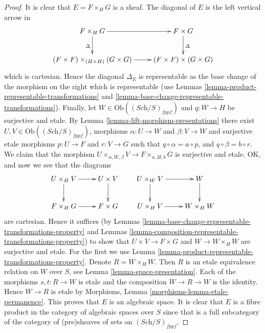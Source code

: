 \begin{proof}
It is clear that $E = F \times_H G$ is a sheaf.
The diagonal of $E$ is the left vertical arrow in
$$
\xymatrix{
F \times_H G \ar[r] \ar[d]_\Delta &
F \times G \ar[d]^\Delta \\
(F \times F) \times_{(H \times H)} (G \times G) \ar[r] &
(F \times F) \times (G \times G)
}
$$
which is cartesian. Hence the diagonal $\Delta_E$ is
representable as the base change of the morphism
on the right which is representable (use Lemmas
\ref{lemma-product-representable-transformations} and
\ref{lemma-base-change-representable-transformations}).
Finally, let $W \in \text{Ob}((\textit{Sch}/S)_{fppf})$
and $q : W \to H$ be surjective and etale.
By Lemma \ref{lemma-lift-morphism-presentations} there exist
$U, V \in \text{Ob}((\textit{Sch}/S)_{fppf})$,
morphisms $\alpha : U \to W$ and $\beta : V \to W$
and surjective etale morphisms $p : U \to F$ and $r : V \to G$
such that $q \circ \alpha = a \circ p$, and
$q \circ \beta = b \circ r$.
We claim that the morphism
$U \times_{\alpha, W, \beta} V \to F \times_{a, H, b} G$
is surjective and etale. OK, and now we see that the diagrams
$$
\xymatrix{
U \times_H V \ar[r] \ar[d] &
U \times V
\ar[d] \\
F \times_H G
\ar[r] &
F \times G
}
\quad
\quad
\xymatrix{
U \times_W V \ar[r] \ar[d] &
W \ar[d] \\
U \times_H V \ar[r] &
W \times_H W
}
$$
are cartesian. Hence it suffices (by
Lemmas \ref{lemma-base-change-representable-transformations-property} and
Lemmas \ref{lemma-composition-representable-transformations-property})
to show that $U \times V \to F \times G$ and
$W \to W \times_H W$ are surjective and etale. For the first we use
Lemma \ref{lemma-product-representable-transformations-property}.
Denote $R = W \times_H W$. Then $R$ is an etale equivalence relation
on $W$ over $S$, see Lemma \ref{lemma-space-presentation}.
Each of the morphisms $s, t : R \to W$ is etale and the
composition $W \to R \to W$ is the identity. Hence $W \to R$
is etale by Morphisms, Lemma \ref{morphisms-lemma-etale-permanence}.
This proves that $E$ is an algebraic space.
It is clear that $E$ is a fibre product in the category of algebraic
spaces over $S$ since that is a full subcategory of the category
of (pre)sheaves of sets on $(\textit{Sch}/S)_{fppf}$.
\end{proof}



























